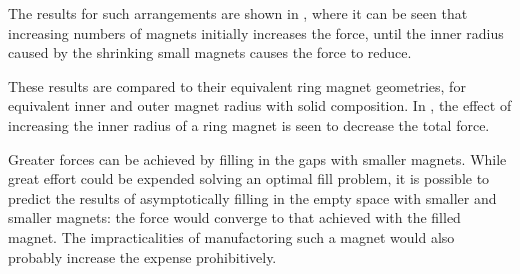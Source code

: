 The results for such arrangements are shown in ,
where it can be seen that increasing numbers of magnets initially
increases the force, until the inner radius caused by the shrinking
small magnets causes the force to reduce.


\begin{figure}
  \begin{subfigure}
  \end{subfigure}\par
  \begin{subfigure}
  \end{subfigure}
\end{figure}

These results are compared to their equivalent ring magnet geometries,
for equivalent inner and outer magnet radius with solid composition. In
, the effect of increasing the inner
radius of a ring magnet is seen to decrease the total force.

\begin{figure}
  \begin{subfigure}
  \end{subfigure}\par
  \begin{subfigure}
  \end{subfigure}
\end{figure}

Greater forces can be achieved by filling in the gaps with smaller
magnets. While great effort could be expended solving an optimal fill
problem,  it
is possible to predict the results of asymptotically filling in the
empty space with smaller and smaller magnets: the force would converge
to that achieved with the filled magnet. The impracticalities of
manufactoring such a magnet would also probably increase the expense
prohibitively.

